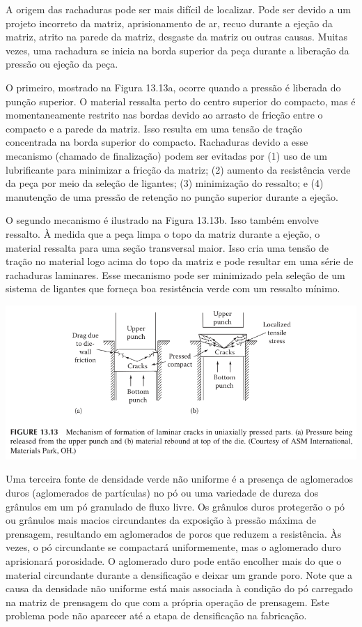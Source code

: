 A origem das rachaduras pode ser mais difícil de localizar. Pode ser devido a um projeto incorreto da matriz, aprisionamento de ar, recuo durante a ejeção da matriz, atrito na parede da matriz, desgaste da matriz ou outras causas. Muitas vezes, uma rachadura se inicia na borda superior da peça durante a liberação da pressão ou ejeção da peça.

O primeiro, mostrado na Figura 13.13a, ocorre quando a pressão é liberada do punção superior. O material ressalta perto do centro superior do compacto, mas é momentaneamente restrito nas bordas devido ao arrasto de fricção entre o compacto e a parede da matriz. Isso resulta em uma tensão de tração concentrada na borda superior do compacto. Rachaduras devido a esse mecanismo (chamado de finalização) podem ser evitadas por (1) uso de um lubrificante para minimizar a fricção da matriz; (2) aumento da resistência verde da peça por meio da seleção de ligantes; (3) minimização do ressalto; e (4) manutenção de uma pressão de retenção no punção superior durante a ejeção.

O segundo mecanismo é ilustrado na Figura 13.13b. Isso também envolve ressalto. À medida que a peça limpa o topo da matriz durante a ejeção, o material ressalta para uma seção transversal maior. Isso cria uma tensão de tração no material logo acima do topo da matriz e pode resultar em uma série de rachaduras laminares. Esse mecanismo pode ser minimizado pela seleção de um sistema de ligantes que forneça boa resistência verde com um ressalto mínimo.

\includegraphics*[width=\linewidth]{./images/formacao_freatura_prensagem.png}

Uma terceira fonte de densidade verde não uniforme é a presença de aglomerados duros (aglomerados de partículas) no pó ou uma variedade de dureza dos grânulos em um pó granulado de fluxo livre. Os grânulos duros protegerão o pó ou grânulos mais macios circundantes da exposição à pressão máxima de prensagem, resultando em aglomerados de poros que reduzem a resistência. Às vezes, o pó circundante se compactará uniformemente, mas o aglomerado duro aprisionará porosidade. O aglomerado duro pode então encolher mais do que o material circundante durante a densificação e deixar um grande poro. Note que a causa da densidade não uniforme está mais associada à condição do pó carregado na matriz de prensagem do que com a própria operação de prensagem. Este problema pode não aparecer até a etapa de densificação na fabricação.


